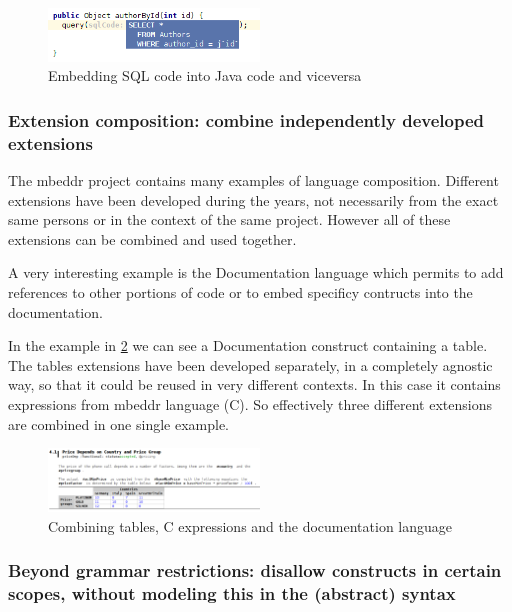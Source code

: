 \documentclass[preprint,numbers,10pt]{sigplanconf}
\begin{document}
\begin{figure}[p]
	\centering
	\includegraphics[width=0.50\textwidth]{screens/minisql_embedded_java.png}
	\caption{Embedding SQL code into Java code and viceversa}
	\label{fig:sqlembeddingjava}
\end{figure}

\subsubsection{Extension composition: combine independently developed extensions}
\label{evr:langcomp}

The mbeddr project contains many examples of language composition. Different extensions have been developed during the years, not necessarily from the exact same persons or in the context of the same project. However all of these extensions can be combined and used together.

A very interesting example is the Documentation language which permits to add references to other portions of code or to embed specificy contructs into the documentation.

In the example in \ref{fig:extensioncomposition} we can see a Documentation construct containing a table. The tables extensions have been developed separately, in a completely agnostic way, so that it could be reused in very different contexts. In this case it contains expressions from mbeddr language (C). So effectively three different extensions are combined in one single example.

\begin{figure}[p]
	\centering
	\includegraphics[width=0.50\textwidth]{screens/extension_composition.png}
	\caption{Combining tables, C expressions and the documentation language}
	\label{fig:extensioncomposition}
\end{figure}

\subsubsection{Beyond grammar restrictions: disallow constructs in certain scopes, without modeling this in the (abstract) syntax}
\label{evr:beyondgrammar}
\end{document}
